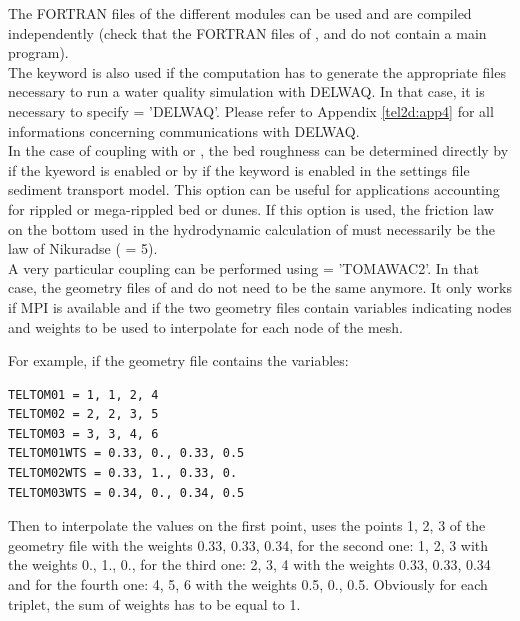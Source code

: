 The FORTRAN files of the different modules can be used and are compiled
independently (check that the FORTRAN files of \gaia, \sisyphe and \tomawac
do not contain a main program).\\

The keyword  is also used if the computation
has to generate the appropriate files necessary to run a water quality
simulation with DELWAQ.
In that case, it is necessary to specify  = 'DELWAQ'.
Please refer to Appendix \ref{tel2d:app4} for all informations concerning
communications with DELWAQ.\\

In the case of coupling  with \gaia or \sisyphe, the bed roughness
can be determined directly by \gaia if the kyeword
 is enabled or by \sisyphe
if the keyword  is enabled in the settings file
sediment transport model. This option can be useful for applications
accounting for rippled or mega-rippled bed or dunes.
If this option is used, the friction law on the bottom used
in the hydrodynamic calculation of  must necessarily be
the law of Nikuradse ( = 5).\\

A very particular coupling can be performed using  =
'TOMAWAC2'.
In that case, the geometry files of  and \tomawac do not need
to be the same anymore.
It only works if MPI is available and if the two geometry files contain
variables indicating nodes and weights to be used to interpolate for each node
of the mesh.

For example, if the \tomawac geometry file contains the variables:

\begin{lstlisting}
TELTOM01 = 1, 1, 2, 4
TELTOM02 = 2, 2, 3, 5
TELTOM03 = 3, 3, 4, 6
TELTOM01WTS = 0.33, 0., 0.33, 0.5
TELTOM02WTS = 0.33, 1., 0.33, 0.
TELTOM03WTS = 0.34, 0., 0.34, 0.5
\end{lstlisting}

Then to interpolate the values on the first point,
\tomawac uses the points 1, 2, 3 of the  geometry file with the
weights 0.33, 0.33, 0.34,
for the second one: 1, 2, 3 with the weights 0., 1., 0.,
for the third one: 2, 3, 4 with the weights 0.33, 0.33, 0.34
and for the fourth one: 4, 5, 6 with the weights 0.5, 0., 0.5.
Obviously for each triplet, the sum of weights has to be equal to 1.

